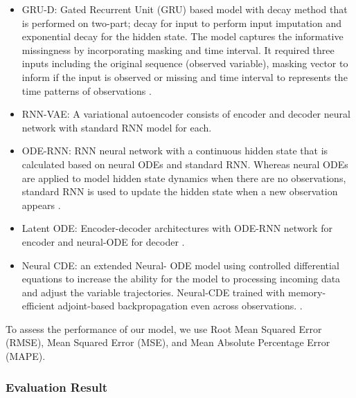 \documentclass[conference]{IEEEtran}
\begin{document}
\begin{itemize}
\item GRU-D: Gated Recurrent Unit (GRU) based model with decay method that is performed on two-part; decay for input to perform input imputation and exponential decay for the hidden state. The model captures the informative missingness by incorporating masking and time interval. It required three inputs including the original sequence (observed variable),  masking vector to inform if the input is observed or missing and time interval to represents the time patterns of observations \cite{che2018recurrent}.
\item RNN-VAE: A variational autoencoder consists of encoder and decoder neural network with standard RNN model for each.
\item ODE-RNN: RNN neural network with a continuous hidden state that is calculated based on neural ODEs and standard  RNN. Whereas neural ODEs are applied to model hidden state dynamics when there are no observations, standard RNN is used to update the hidden state when a new observation appears \cite{rubanova2019latent}.
\item Latent ODE: Encoder-decoder architectures with ODE-RNN network for encoder and neural-ODE for decoder \cite{rubanova2019latent}.
\item Neural CDE:  an extended Neural- ODE model using controlled differential equations to increase the ability for the model to processing incoming data and adjust the variable trajectories. Neural-CDE trained with memory-efficient adjoint-based backpropagation even across observations. \cite{kidger2020neural}.
\end{itemize}

To assess the performance of our model, we use Root Mean Squared Error (RMSE), Mean Squared Error (MSE), and Mean Absolute Percentage Error (MAPE).

\subsubsection{Evaluation Result}
\end{document}
